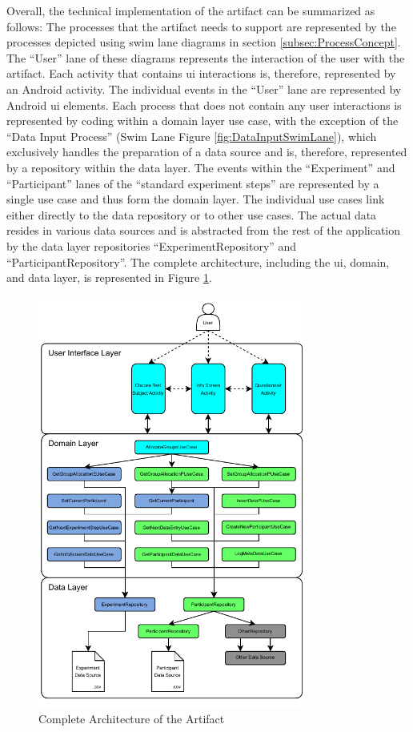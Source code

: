 Overall, the technical implementation of the artifact can be summarized as follows: The processes that the artifact needs to support are represented by the processes depicted using swim lane diagrams in section \ref{subsec:ProcessConcept}. The \enquote{User} lane of these diagrams represents the interaction of the user with the artifact. Each activity that contains \ac{ui} interactions is, therefore, represented by an Android activity. The individual events in the \enquote{User} lane are represented by Android \ac{ui} elements. Each process that does not contain any user interactions is represented by coding within a domain layer use case, with the exception of the \enquote{Data Input Process} (Swim Lane Figure \ref{fig:DataInputSwimLane}), which exclusively handles the preparation of a data source and is, therefore, represented by a repository within the data layer. The events within the \enquote{Experiment} and \enquote{Participant} lanes of the \enquote{standard experiment steps} are represented by a single use case and thus form the domain layer. The individual use cases link either directly to the data repository or to other use cases. The actual data resides in various data sources and is abstracted from the rest of the application by the data layer repositories \enquote{ExperimentRepository} and \enquote{ParticipantRepository}. The complete architecture, including the \ac{ui}, domain, and data layer, is represented in Figure \ref{fig:completeArchitecture}.


\begin{figure}[htbp]
    \centering
    \includegraphics[width=0.79\textwidth, keepaspectratio]{content/05_design_and_dev_artefacts/Complete Architecture.drawio.pdf}
    \caption{Complete Architecture of the Artifact}    
    \label{fig:completeArchitecture}
\end{figure}